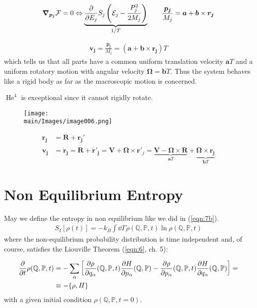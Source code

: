 \documentclass[../../main.tex]{subfiles}
\begin{document}
\begin{align}\label{eqn:80}
    \grad_{\bm{p_j}} \mathcal{F} = 0 \Leftrightarrow \underbrace{\pdv{E_j} S_j \left(\mathcal{E}_j - \frac{P_j^2}{2 M_j} \right)}_{1/T} \qquad \frac{\bm{p_j}}{M_j} = \bm{a} + \bm{b} \times \bm{r_j}
\end{align}

\begin{align}\label{eqn:81}
    \bm{v_j} = \frac{\bm{p_j}}{M_j} = (\bm{a} + \bm{b} \times \bm{r_j}) T
\end{align}
which tells us that all parts have a common uniform translation velocity $\bm{a}T$ and a uniform rotatory motion with angular velocity $\bm{\Omega} = \bm{b}T$. Thus the system behaves like a rigid body as far as the macroscopic motion is concerned.

\medskip

$\operatorname{He}^4$ is exceptional since it cannot rigidly rotate.

\begin{figure}[H]
    \centering
    \texttt{[image: \\main/Images/image006.png]}
    \caption{\label{fig:rotations}}
\end{figure}

\begin{align*}
    \bm{r_j} &= \bm{R} + \bm{r_j'}\\
    \bm{v_j} &= \dot{\bm{r}}_{\bm{j}} = \dot{\bm{R}} + \dot{\bm{r}}'_{\bm{j}} = \bm{V} + \bm{\Omega} \times \bm{r}'_j = \underbrace{\bm{V} - \bm{\Omega} \times \bm{R}}_{\bm{a}T} + \underbrace{\bm{\Omega} \times \bm{r_j}}_{\bm{b}T}
\end{align*}

\section{Non Equilibrium Entropy}
May we define the entropy in non equilibrium like we did in (\ref{eqn:7b}).
\begin{align}\label{eqn:82}
    S_I[\rho(t)] = -k_B \int \dd{\Gamma} \rho(\mathbb{Q}, \mathbb{P}, t) \ln \rho(\mathbb{Q}, \mathbb{P},t)
\end{align}
where the non-equilibrium probability distribution is time independent and, of course, satisfies the Liouville Theorem (\ref{eqn:6}, ch. 5):

\begin{align}\label{eqn:83}
    \pdv{t} \rho(\mathbb{Q}, \mathbb{P}, t) &= - \sum_\alpha \left[{\pdv{\rho}{q_\alpha}}(\mathbb{Q}, \mathbb{P},t) {\pdv{H}{p_\alpha}}(\mathbb{Q}, \mathbb{P}) - {\pdv{\rho}{p_\alpha}}(\mathbb{Q}, \mathbb{P}, t) {\pdv{H}{q_\alpha}}(\mathbb{Q}, \mathbb{P}) \right] =\\
    &\equiv -\{\rho, H\} \nonumber
\end{align}
with a given initial condition $\rho(\mathbb{Q}, \mathbb{P}, t=0)$.
\end{document}
